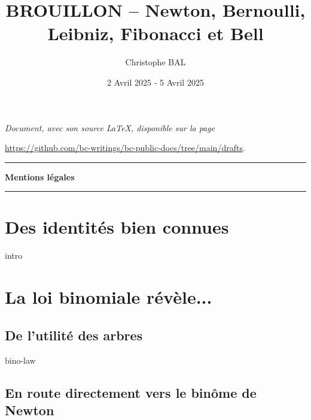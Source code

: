 \documentclass[12pt]{amsart}
\begin{document}
\title{BROUILLON -- Newton, Bernoulli, Leibniz, Fibonacci et Bell}
\author{Christophe BAL}
\date{2 Avril 2025 - 5 Avril 2025}

\maketitle

\begin{center}
	\itshape
	Document, avec son source \LaTeX, disponible sur la page

	\url{https://github.com/bc-writings/bc-public-docs/tree/main/drafts}.
\end{center}


\bigskip


\begin{center}
	\hrule\vspace{.3em}
	{
		\fontsize{1.35em}{1em}\selectfont
		\textbf{Mentions \og légales \fg}
	}

	\vspace{0.45em}
	\doclicenseThis
	\hrule
\end{center}


\bigskip


\setcounter{tocdepth}{2}
\tableofcontents




\newpage

\section{Des identités bien connues}

{intro}




\section{La loi binomiale révèle...}

\subsection{De l'utilité des arbres}

{bino-law}


\subsection{En route directement vers le binôme de Newton}
\end{document}

